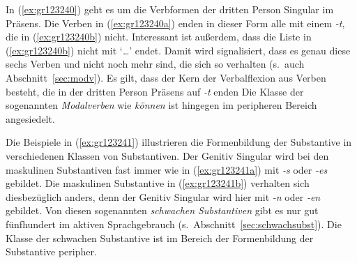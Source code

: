 
In (\ref{ex:gr123240}) geht es um die Verbformen der dritten Person Singular im Präsens.
Die Verben in (\ref{ex:gr123240a}) enden in dieser Form alle mit einem \textit{-t}, die in (\ref{ex:gr123240b}) nicht.
Interessant ist außerdem, dass die Liste in (\ref{ex:gr123240b}) nicht mit `\textit{\ldots}' endet.
Damit wird signalisiert, dass es genau diese sechs Verben und nicht noch mehr sind, die sich so verhalten (s.\ auch Abschnitt~\ref{sec:modv}).
Es gilt, dass der Kern der Verbalflexion aus Verben besteht, die in der dritten Person Präsens auf \textit{-t} enden
Die Klasse der sogenannten \textit{Modalverben} wie \textit{können} ist hingegen im peripheren Bereich angesiedelt.


Die Beispiele in (\ref{ex:gr123241}) illustrieren die Formenbildung der Substantive in verschiedenen Klassen von Substantiven.
Der Genitiv Singular wird bei den maskulinen Substantiven fast immer wie in (\ref{ex:gr123241a}) mit \textit{-s} oder \textit{-es} gebildet.
Die maskulinen Substantive in (\ref{ex:gr123241b}) verhalten sich diesbezüglich anders, denn der Genitiv Singular wird hier mit \textit{-n} oder \textit{-en} gebildet.
Von diesen sogenannten \textit{schwachen Substantiven} gibt es nur gut fünfhundert im aktiven Sprachgebrauch (s.\ Abschnitt~\ref{sec:schwachsubst}).
Die Klasse der schwachen Substantive ist im Bereich der Formenbildung der Substantive peripher.


